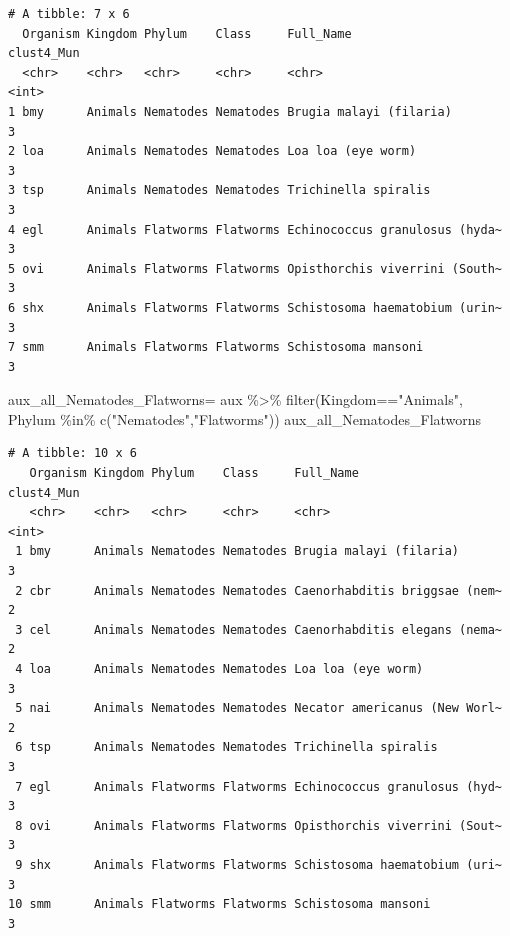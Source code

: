 \documentclass[
  letterpaper,
  DIV=11,
  numbers=noendperiod]{scrreprt}
\newenvironment{Shaded}{}{}
\newcommand{\FunctionTok}[1]{\textcolor[rgb]{0.38,0.69,0.94}{#1}}
\newcommand{\NormalTok}[1]{\textcolor[rgb]{0.67,0.70,0.75}{#1}}
\newcommand{\OtherTok}[1]{\textcolor[rgb]{0.15,0.68,0.38}{#1}}
\newcommand{\SpecialCharTok}[1]{\textcolor[rgb]{0.34,0.71,0.76}{#1}}
\newcommand{\StringTok}[1]{\textcolor[rgb]{0.60,0.76,0.47}{#1}}
\begin{document}
\begin{verbatim}
# A tibble: 7 x 6
  Organism Kingdom Phylum    Class     Full_Name                      clust4_Mun
  <chr>    <chr>   <chr>     <chr>     <chr>                               <int>
1 bmy      Animals Nematodes Nematodes Brugia malayi (filaria)                 3
2 loa      Animals Nematodes Nematodes Loa loa (eye worm)                      3
3 tsp      Animals Nematodes Nematodes Trichinella spiralis                    3
4 egl      Animals Flatworms Flatworms Echinococcus granulosus (hyda~          3
5 ovi      Animals Flatworms Flatworms Opisthorchis viverrini (South~          3
6 shx      Animals Flatworms Flatworms Schistosoma haematobium (urin~          3
7 smm      Animals Flatworms Flatworms Schistosoma mansoni                     3
\end{verbatim}

\begin{Shaded}
\begin{Highlighting}[]
\NormalTok{aux\_all\_Nematodes\_Flatworns}\OtherTok{=}\NormalTok{ aux }\SpecialCharTok{\%\textgreater{}\%} 
  \FunctionTok{filter}\NormalTok{(Kingdom}\SpecialCharTok{==}\StringTok{"Animals"}\NormalTok{,}
\NormalTok{         Phylum }\SpecialCharTok{\%in\%} \FunctionTok{c}\NormalTok{(}\StringTok{"Nematodes"}\NormalTok{,}\StringTok{"Flatworms"}\NormalTok{))}
\NormalTok{aux\_all\_Nematodes\_Flatworns}
\end{Highlighting}
\end{Shaded}

\begin{verbatim}
# A tibble: 10 x 6
   Organism Kingdom Phylum    Class     Full_Name                     clust4_Mun
   <chr>    <chr>   <chr>     <chr>     <chr>                              <int>
 1 bmy      Animals Nematodes Nematodes Brugia malayi (filaria)                3
 2 cbr      Animals Nematodes Nematodes Caenorhabditis briggsae (nem~          2
 3 cel      Animals Nematodes Nematodes Caenorhabditis elegans (nema~          2
 4 loa      Animals Nematodes Nematodes Loa loa (eye worm)                     3
 5 nai      Animals Nematodes Nematodes Necator americanus (New Worl~          2
 6 tsp      Animals Nematodes Nematodes Trichinella spiralis                   3
 7 egl      Animals Flatworms Flatworms Echinococcus granulosus (hyd~          3
 8 ovi      Animals Flatworms Flatworms Opisthorchis viverrini (Sout~          3
 9 shx      Animals Flatworms Flatworms Schistosoma haematobium (uri~          3
10 smm      Animals Flatworms Flatworms Schistosoma mansoni                    3
\end{verbatim}
\end{document}
